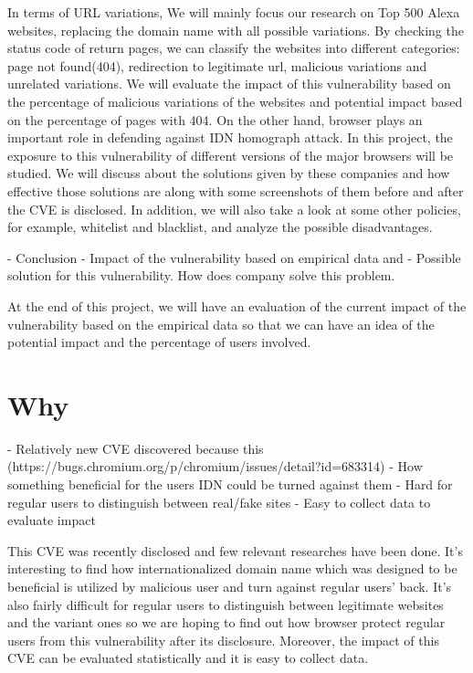 \documentclass[letterpaper,twocolumn,10pt]{article}
\begin{document}
In terms of URL variations, We will mainly focus our research on Top 500 Alexa websites, replacing the domain name with all possible variations. By checking the status code of return pages, we can classify the websites into different categories: page not found(404), redirection to legitimate url, malicious variations and unrelated variations. We will evaluate the impact of this vulnerability based on the percentage of malicious variations of the websites and potential impact based on the percentage of pages with 404. On the other hand, browser plays an important role in defending against IDN homograph attack. In this project, the exposure to this vulnerability of different versions of the major browsers will be studied. We will discuss about the solutions given by these companies and how effective those solutions are along with some screenshots of them before and after the CVE is disclosed. In addition, we will also take a look at some other policies, for example, whitelist and blacklist, and analyze the possible disadvantages.

- Conclusion
  - Impact of the vulnerability based on empirical data and %
  - Possible solution for this vulnerability. How does company solve this problem.

At the end of this project, we will have an evaluation of the current impact of the vulnerability based on the empirical data so that we can have an idea of the potential impact and the percentage of users involved.

\section{Why}
- Relatively new CVE discovered because this (https://bugs.chromium.org/p/chromium/issues/detail?id=683314)
- How something beneficial for the users IDN could be turned against them
- Hard for regular users to distinguish between real/fake sites
- Easy to collect data to evaluate impact

This CVE was recently disclosed and few relevant researches have been done. It's interesting to find how internationalized domain name which was designed to be beneficial is utilized by malicious user and turn against regular users' back. It's also fairly difficult for regular users to distinguish between legitimate websites and the variant ones so we are hoping to find out how browser protect regular users from this vulnerability after its disclosure. Moreover, the impact of this CVE can be evaluated statistically and it is easy to collect data.
\end{document}
